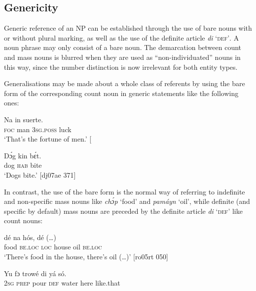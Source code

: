 \subsection{Genericity}\label{sec:5.1.4}

Generic reference of an NP can be established through the use of bare nouns with or without plural marking, as well as the use of the definite article \textit{di} ‘\textsc{def’}. A noun phrase may only consist of a bare noun. The demarcation between count and mass nouns is blurred when they are used as “non-individuated” \citep{Mufwene1986} nouns in this way, since the number distinction is now irrelevant for both entity types. 


Generalisations may be made about a whole class of referents by using the bare form of the corresponding count noun in generic statements like the following ones: 



\ea%
    \label{ex:key:222}
    \gll Na    in    suerte.\\
\textsc{foc}  man    \textsc{3sg.poss}  luck\\

\glt ‘That’s the fortune of men.’ [\textstylePichiexamplenumberZchnZchn{fr03ft 194]}
\z


\ea%
    \label{ex:key:223}
    \gll Dɔ́g    kin  bɛ́t.\\
dog    \textsc{hab}  bite\\

\glt ‘Dogs bite.’ [dj07ae 371]
\z

In contrast, the use of the bare form is the normal way of referring to indefinite and non-specific mass nouns like \textit{chɔ́p} ‘food’ and \textit{pamáyn} ‘oil’, while definite (and specific by default) mass nouns are preceded by the definite article \textit{di} ‘\textsc{def’} like count nouns:

\ea%
 \label{ex:key:224}
 \gll  {}  dé    na  hós,       dé     (…)\\
food    \textsc{be.loc}  \textsc{loc}  house  oil    \textsc{be.loc}\\

\glt ‘There’s food in the house, there’s oil (…)’ [ro05rt 050]
\z


\ea%
    \label{ex:key:225}
    \gll Yu  fɔ  trowé  di    yá    só.\\
\textsc{2sg}  \textsc{prep}  pour  \textsc{def}  water  here    like.that\\

